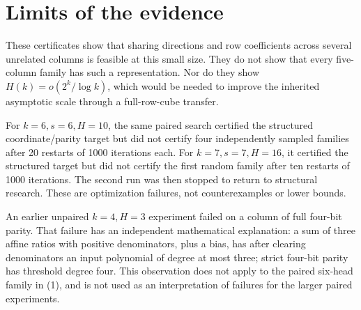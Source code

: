 \documentclass[11pt]{article}
\begin{document}
\section{Limits of the evidence}

These certificates show that sharing directions and row coefficients
across several unrelated columns is feasible at this small size.
They do not show that every five-column family has such a representation.
Nor do they show $H(k)=o(2^k/\log k)$, which would be needed to improve the
inherited asymptotic scale through a full-row-cube transfer.

For $k=6,s=6,H=10$, the same paired search certified the structured
coordinate/parity target but did not certify four independently sampled
families after 20 restarts of 1000 iterations each. For $k=7,s=7,H=16$,
it certified the structured target but did not certify the first random
family after ten restarts of 1000 iterations. The second run was then
stopped to return to structural research. These are optimization failures,
not counterexamples or lower bounds.

An earlier unpaired $k=4,H=3$ experiment failed on a column of full
four-bit parity. That failure has an independent mathematical explanation:
a sum of three affine ratios with positive denominators, plus a bias,
has after clearing denominators an input polynomial of degree at most
three; strict four-bit parity has threshold degree four. This observation
does not apply to the paired six-head family in (1), and is not used as
an interpretation of failures for the larger paired experiments.
\end{document}
